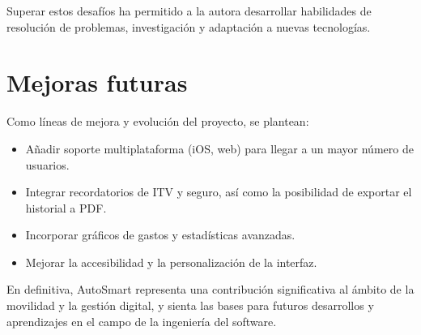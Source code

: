 Superar estos desafíos ha permitido a la autora desarrollar habilidades de resolución de problemas, investigación y adaptación a nuevas tecnologías.

\section*{Mejoras futuras}
Como líneas de mejora y evolución del proyecto, se plantean:
\begin{itemize}
    \item Añadir soporte multiplataforma (iOS, web) para llegar a un mayor número de usuarios.
    \item Integrar recordatorios de ITV y seguro, así como la posibilidad de exportar el historial a PDF.
    \item Incorporar gráficos de gastos y estadísticas avanzadas.
    \item Mejorar la accesibilidad y la personalización de la interfaz.
\end{itemize}

En definitiva, AutoSmart representa una contribución significativa al ámbito de la movilidad y la gestión digital, y sienta las bases para futuros desarrollos y aprendizajes en el campo de la ingeniería del software. 